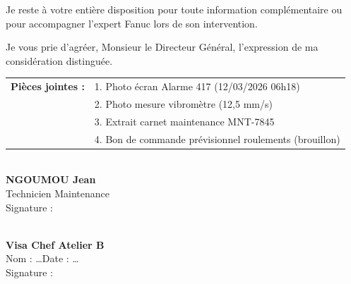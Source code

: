 \documentclass[11pt]{article}
\begin{document}
\begin{exoresolu}
\vspace{0.3cm}
\noindent
Je reste à votre entière disposition pour toute information complémentaire ou pour accompagner l'expert Fanuc lors de son intervention.

\vspace{0.5cm}
\noindent
Je vous prie d'agréer, Monsieur le Directeur Général, l'expression de ma considération distinguée.

\vspace{1cm}
\noindent
\begin{tabular}{ll}
\textbf{Pièces jointes :} & 1. Photo écran Alarme 417 (12/03/2026 06h18)\\
& 2. Photo mesure vibromètre (12,5 mm/s)\\
& 3. Extrait carnet maintenance MNT-7845\\
& 4. Bon de commande prévisionnel roulements (brouillon)
\end{tabular}

\vspace{1.5cm}
\noindent
\begin{minipage}{0.45\linewidth}
\hrulefill\\
\textbf{NGOUMOU Jean}\\
Technicien Maintenance\\
Signature :
\end{minipage}
\hfill
\begin{minipage}{0.45\linewidth}
\hrulefill\\
\textbf{Visa Chef Atelier B}\\
Nom : \dots\hfill Date : \dots\\
Signature :
\end{minipage}
\end{exoresolu}
\end{document}
